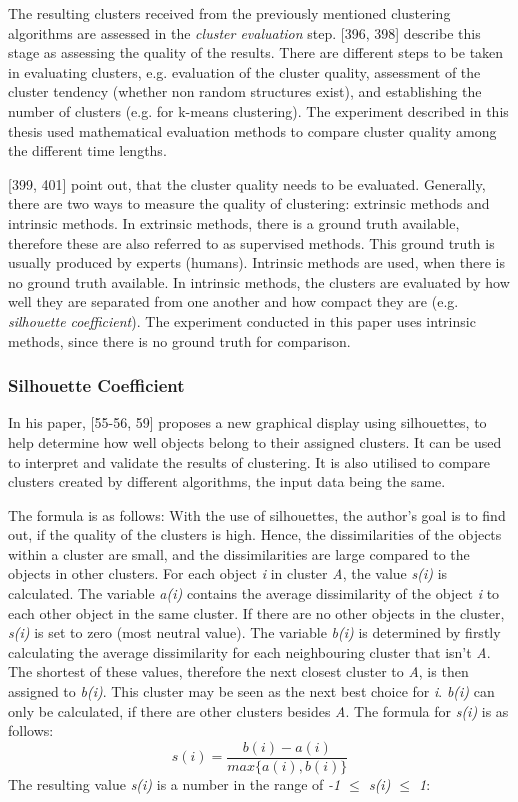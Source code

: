 The resulting clusters received from the previously mentioned clustering algorithms are assessed in the \textit{cluster evaluation} step. \textcite{han2011data}[396, 398] describe this stage as assessing the quality of the results.
There are different steps to be taken in evaluating clusters, e.g. evaluation of the cluster quality, assessment of the cluster tendency (whether non random structures exist), and establishing the number of clusters (e.g. for k-means clustering). The experiment described in this thesis used mathematical evaluation methods to compare cluster quality among the different time lengths. 
 

\textcite{han2011data}[399, 401] point out, that the cluster quality needs to be evaluated. Generally, there are two ways to measure the quality of clustering: extrinsic methods and intrinsic methods. In extrinsic methods, there is a ground truth available, therefore these are also referred to as supervised methods. This ground truth is usually produced by experts (humans). Intrinsic methods are used, when there is no ground truth available. In intrinsic methods, the clusters are evaluated by how well they are separated from one another and how compact they are (e.g. \textit{silhouette coefficient}). The experiment conducted in this paper uses intrinsic methods, since there is no ground truth for comparison.


\subsubsection{Silhouette Coefficient}
\label{section:silhouetteCoefficient}
In his paper, \textcite{rousseeuw1987silhouettes}[55-56, 59] proposes a new graphical display using silhouettes, to help determine how well objects belong to their assigned clusters. It can be used to interpret and validate the results of clustering. It is also utilised to compare clusters created by different algorithms, the input data being the same.

The formula is as follows:
With the use of silhouettes, the author's goal is to find out, if the quality of the clusters is high. Hence, the dissimilarities of the objects within a cluster are small, and the dissimilarities are large compared to the objects in other clusters. For each object \textit{i} in cluster \textit{A}, the value \textit{s(i)} is calculated. The variable \textit{a(i)} contains the average dissimilarity of the object \textit{i} to each other object in the same cluster. If there are no other objects in the cluster, \textit{s(i)} is set to zero (most neutral value). The variable \textit{b(i)} is determined by firstly calculating the average dissimilarity for each neighbouring cluster that isn't \textit{A}. The shortest of these values, therefore the next closest cluster to \textit{A}, is then assigned to \textit{b(i)}. This cluster may be seen as the next best choice for \textit{i}. \textit{b(i)} can only be calculated, if there are other clusters besides \textit{A}. The formula for \textit{s(i)} is as follows:
\[
  s(i) = \frac{b(i) - a(i)}{max\{a(i), b(i)\}}  
\]
The resulting value \textit{s(i)} is a number in the range of \textit{-1 $\leq$ \textit{s(i)} $\leq$ 1}:

